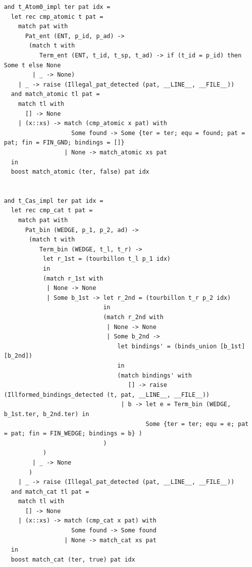 \documentclass[12pt]{article}
\begin{document}
\begin{tiny}
\begin{verbatim}
and t_Atom0_impl ter pat idx =
  let rec cmp_atomic t pat =
    match pat with
      Pat_ent (ENT, p_id, p_ad) ->
       (match t with   
          Term_ent (ENT, t_id, t_sp, t_ad) -> if (t_id = p_id) then Some t else None
        | _ -> None)
    | _ -> raise (Illegal_pat_detected (pat, __LINE__, __FILE__))
  and match_atomic tl pat =
    match tl with
      [] -> None
    | (x::xs) -> match (cmp_atomic x pat) with
                   Some found -> Some {ter = ter; equ = found; pat = pat; fin = FIN_GND; bindings = []}
                 | None -> match_atomic xs pat
  in
  boost match_atomic (ter, false) pat idx


and t_Cas_impl ter pat idx =
  let rec cmp_cat t pat =
    match pat with
      Pat_bin (WEDGE, p_1, p_2, ad) ->
       (match t with
          Term_bin (WEDGE, t_l, t_r) ->
           let r_1st = (tourbillon t_l p_1 idx)
           in
           (match r_1st with
            | None -> None
            | Some b_1st -> let r_2nd = (tourbillon t_r p_2 idx)
                            in
                            (match r_2nd with
                             | None -> None
                             | Some b_2nd ->
                                let bindings' = (binds_union [b_1st] [b_2nd])
                                in
                                (match bindings' with
                                   [] -> raise (Illformed_bindings_detected (t, pat, __LINE__, __FILE__))
                                 | b -> let e = Term_bin (WEDGE, b_1st.ter, b_2nd.ter) in
                                        Some {ter = ter; equ = e; pat = pat; fin = FIN_WEDGE; bindings = b} )
                            )
           )
        | _ -> None
       )
    | _ -> raise (Illegal_pat_detected (pat, __LINE__, __FILE__))
  and match_cat tl pat =
    match tl with
      [] -> None
    | (x::xs) -> match (cmp_cat x pat) with
                   Some found -> Some found
                 | None -> match_cat xs pat
  in
  boost match_cat (ter, true) pat idx



\end{verbatim}
\end{tiny}
\end{document}
